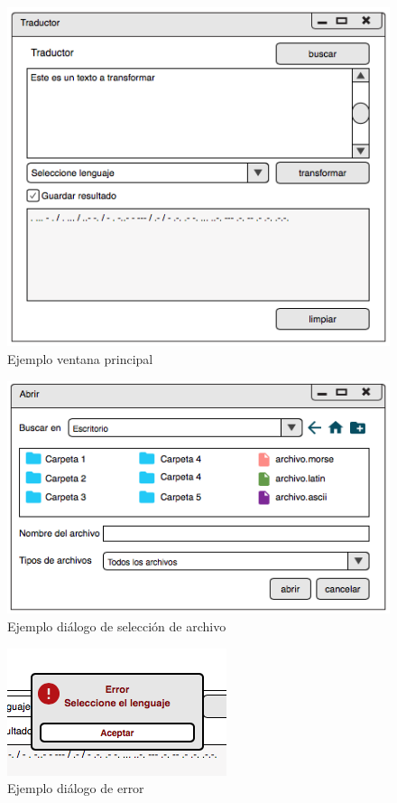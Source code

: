 \documentclass[a4paper,10pt]{article}
\theoremstyle{mytheor}
\begin{document}
\begin{figure}[H]
    \begin{center}
        \caption{Ejemplo ventana principal}\label{fig:v1}
        \includegraphics[scale=.65]{v1.png}
    \end{center}
\end{figure}

\begin{figure}[H]
    \begin{center}
        \caption{Ejemplo di\'alogo de selecci\'on de archivo}\label{fig:v2}
        \includegraphics[scale=.65]{v2.png}
    \end{center}
\end{figure}

\begin{figure}[H]
    \begin{center}
        \caption{Ejemplo di\'alogo de error}\label{fig:v3}
        \includegraphics[scale=.65]{v3.png}
    \end{center}
\end{figure}
\end{document}
